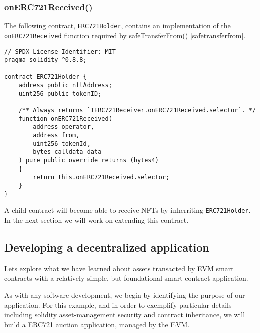 \documentclass{article}
\theoremstyle{theorem}
\theoremstyle{definition}
\theoremstyle{remark}
\begin{document}
\subsubsection{onERC721Received()}\label{onerc721received}

\medskip\noindent
The following contract, \texttt{ERC721Holder}, contains an implementation of the \texttt{onERC721Received} function required by \colorbox{Gainsboro!60!Lavender}{safeTransferFrom()} \ref{safetransferfrom}. 

\medskip\noindent
\begin{itemize}
\begin{lstlisting}
// SPDX-License-Identifier: MIT
pragma solidity ^0.8.8;

contract ERC721Holder {
    address public nftAddress;
    uint256 public tokenID;

    /** Always returns `IERC721Receiver.onERC721Received.selector`. */
    function onERC721Received( 
        address operator, 
        address from, 
        uint256 tokenId, 
        bytes calldata data 
    ) pure public override returns (bytes4) 
    {
        return this.onERC721Received.selector;
    }
}
\end{lstlisting}
\end{itemize}

\medskip\noindent
A child contract will become able to receive NFTs by inherriting \texttt{ERC721Holder}. In the next section we will work on extending this contract.

\subsection{Developing a decentralized application}

Lets explore what we have learned about assets transacted by EVM smart contracts with a relatively simple, but foundational smart-contract application.

\medskip\noindent
As with any software development, we begin by identifying the purpose of our application. For this example, and in order to exemplify particular details including solidity asset-management security and contract inheritance, we will build a ERC721 auction application, managed by the EVM. 
\end{document}

